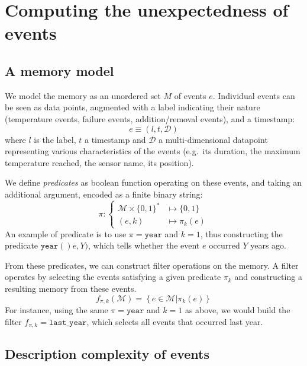 \documentclass[conference]{IEEEtran}
\begin{document}
\section{Computing the unexpectedness of events}
\label{sec:computing}
\subsection{A memory model}
We model the memory as an unordered set $M$ of events $e$. Individual events can
be seen as data points, augmented with a label indicating their nature
(temperature events, failure events, addition/removal events), and a timestamp:
\begin{equation}
  \label{eq:event}
  e \equiv (l, t,\mathcal{D})
\end{equation}
where $l$ is the label, $t$ a timestamp and $\mathcal{D}$ a multi-dimensional
datapoint representing various characteristics of the events (e.g.~its duration,
the maximum temperature reached, the sensor name, its position).

We define \emph{predicates} as boolean function operating on these events, and
taking an additional argument, encoded as a finite binary string:
\begin{equation}
  \label{eq:predicate}
  \pi : \begin{cases}
    \mathcal{M}\times \{0,1\}^{*} &\mapsto \{0,1\} \\
    (e, k) &\mapsto \pi_{k}(e)
    \end{cases}
\end{equation}
An example of predicate is to use $\pi = \mathtt{year}$ and $k=1$, thus
constructing the predicate $\mathtt{year()}e, Y\mathtt{)}$, which tells whether
the event $e$ occurred $Y$ years ago.

From these predicates, we can construct filter operations on the memory. A
filter operates by selecting the events satisfying a given predicate
$\pi_{k}$ and constructing a resulting memory from these events.
\begin{equation}
  \label{eq:filter}
 f_{\pi, k}(\mathcal{M}) = \left\{e \in \mathcal{M} | \pi_{k}(e) \right\}
\end{equation}
For instance, using the same $\pi = \mathtt{year}$ and $k=1$ as above, we would
build the filter $f_{\pi, k} = \mathtt{last\_{}year}$, which selects all events
that occurred last year.

\subsection{Description complexity of events}
\end{document}
